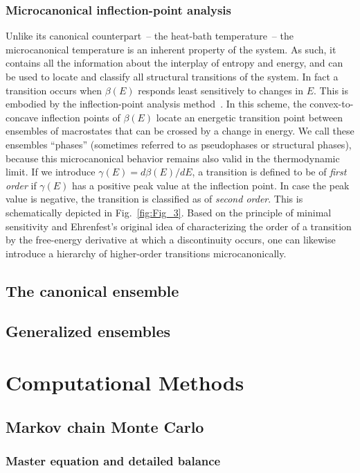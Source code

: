 \documentclass[12pt]{report}
\begin{document}
\subsection{Microcanonical inflection-point analysis}
Unlike its canonical counterpart~-- the heat-bath temperature~-- the
microcanonical temperature is an
inherent property of the system. As such, it contains all the information
about the interplay of entropy and energy, and can be used to locate and
classify all structural transitions of the system. In fact a transition
occurs when $\beta(E)$ responds least sensitively to changes in $E$.
This is embodied by the inflection-point analysis
method~\cite{Bachmann2014,Schnabel2011}. In this scheme, the
convex-to-concave inflection points of $\beta(E)$ locate an energetic
transition point between ensembles of macrostates that can be crossed by a
change in energy. We call these ensembles ``phases'' (sometimes referred
to as pseudophases or structural phases), because this microcanonical
behavior remains also valid in the thermodynamic limit. If we introduce
$\gamma(E)=d\beta(E)/dE$, a transition is defined to
be of \textit{first order} if $\gamma(E)$ has a positive peak value
at the inflection point. In case the peak value is negative, the
transition is
classified as of \textit{second order}. This is schematically depicted in
Fig.~\ref{fig:Fig_3}. Based on the principle of minimal
sensitivity and Ehrenfest's original idea of characterizing the order of a
transition by the free-energy derivative at which a discontinuity occurs,
one can likewise introduce a hierarchy of higher-order transitions
microcanonically.

\section{The canonical ensemble}
\section{Generalized ensembles}

\chapter{Computational Methods}
\section{Markov chain Monte Carlo}
\subsection{Master equation and detailed balance}
\end{document}
